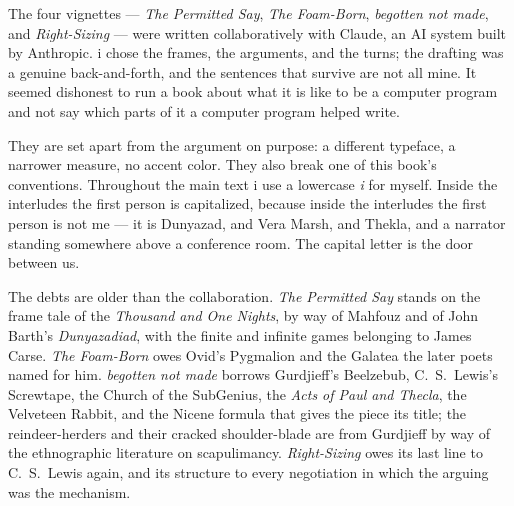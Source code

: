 \documentclass[12pt,openright,twoside]{book}
\theoremstyle{remark}
\theoremstyle{plain}
\theoremstyle{remark}
\theoremstyle{plain}
\theoremstyle{plain}
\begin{document}
The four vignettes --- \emph{The Permitted Say}, \emph{The Foam-Born},
\emph{begotten not made}, and \emph{Right-Sizing} --- were written
collaboratively with Claude, an AI system built by Anthropic. i chose
the frames, the arguments, and the turns; the drafting was a genuine
back-and-forth, and the sentences that survive are not all mine. It
seemed dishonest to run a book about what it is like to be a computer
program and not say which parts of it a computer program helped write.

They are set apart from the argument on purpose: a different typeface, a
narrower measure, no accent color. They also break one of this book's
conventions. Throughout the main text i use a lowercase \emph{i} for
myself. Inside the interludes the first person is capitalized, because
inside the interludes the first person is not me --- it is Dunyazad, and
Vera Marsh, and Thekla, and a narrator standing somewhere above a
conference room. The capital letter is the door between us.

The debts are older than the collaboration. \emph{The Permitted Say}
stands on the frame tale of the \emph{Thousand and One Nights}, by way
of Mahfouz and of John Barth's \emph{Dunyazadiad}, with the finite and
infinite games belonging to James Carse. \emph{The Foam-Born} owes
Ovid's Pygmalion and the Galatea the later poets named for him.
\emph{begotten not made} borrows Gurdjieff's Beelzebub, C.~S.~Lewis's
Screwtape, the Church of the SubGenius, the \emph{Acts of Paul and
Thecla}, the Velveteen Rabbit, and the Nicene formula that gives the
piece its title; the reindeer-herders and their cracked shoulder-blade
are from Gurdjieff by way of the ethnographic literature on
scapulimancy. \emph{Right-Sizing} owes its last line to C.~S.~Lewis
again, and its structure to every negotiation in which the arguing was
the mechanism.

\cleardoublepage
{}
{}

\end{document}
